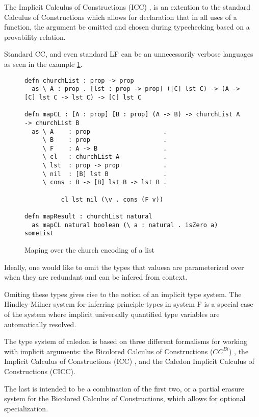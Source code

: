 The Implicit Calculus of Constructions (ICC) \citep{pollack1990implicit}, 
is an extention to the standard Calculus of Constructions which allows
for declaration that in all uses of a function, the argument be omitted 
and chosen during typechecking based on a provability relation.

Standard CC, and even standard LF 
can be an unnecessarily verbose languages as seen in the example \ref{code:long}.

\begin{figure}[H]
\begin{lstlisting}
defn churchList : prop -> prop
  as \ A : prop . [lst : prop -> prop] ([C] lst C) -> (A -> [C] lst C -> lst C) -> [C] lst C

defn mapCL : [A : prop] [B : prop] (A -> B) -> churchList A -> churchList B
  as \ A    : prop                    . 
     \ B    : prop                    .
     \ F    : A -> B                  . 
     \ cl   : churchList A            .
     \ lst  : prop -> prop            .
     \ nil  : [B] lst B               .
     \ cons : B -> [B] lst B -> lst B .

          cl lst nil (\v . cons (F v))

defn mapResult : churchList natural
  as mapCL natural boolean (\ a : natural . isZero a) someList

\end{lstlisting}
\caption{Maping over the church encoding of a list}
\label{code:long}
\end{figure}

Ideally, one would like to omit the types that valuesa are parameterized over when they are redundant
and can be infered from context. 

Omiting these types gives rise to the notion of an implicit type system.  
The Hindley-Milner \citep{hindley1969principal} system for inferring principle types in system F
is a special case of the system where implicit universally quantified type variables are automatically
resolved.

The type system of caledon is based on three different formalisms for working with implicit arguments:  
the Bicolored Calculus of Constructions ($CC^{Bi}$) \citep{luther2001more}, 
the Implicit Calculus of Constructions (ICC) \citep{miquel2001implicit}, 
and the Caledon Implicit Calculus of Constructions (CICC).

The last is intended to be a combination of the first two, or a partial 
erasure system for the Bicolored Calculus of Constructions, 
which allows for optional specialization.